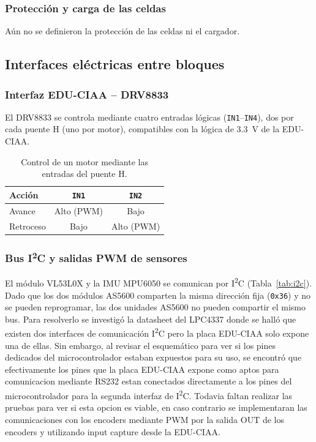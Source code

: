 \subsubsection{Protección y carga de las celdas}
Aún no se definieron la protección de las celdas ni el cargador.

\subsection{Interfaces eléctricas entre bloques}
\subsubsection{Interfaz EDU-CIAA -- DRV8833}
El DRV8833 se controla mediante cuatro entradas lógicas (\texttt{IN1}--\texttt{IN4}), dos por cada puente H (uno por motor), compatibles con la lógica de \SI{3,3}{V} de la EDU-CIAA.

\begin{table}[H]
\centering
\caption{Control de un motor mediante las entradas del puente H.}
\label{tab:logica}
\begin{tabular}{lcc}
\toprule
Acción & \texttt{IN1} & \texttt{IN2} \\
\midrule
Avance & Alto (PWM) & Bajo \\
Retroceso & Bajo & Alto (PWM) \\
\bottomrule
\end{tabular}
\end{table}

\subsubsection{Bus \texorpdfstring{I\textsuperscript{2}C}{I2C} y salidas PWM de sensores}\label{sec:i2c}
El módulo VL53L0X y la IMU MPU6050 se comunican por I\textsuperscript{2}C (Tabla~\ref{tab:i2c}). Dado que los dos módulos AS5600 comparten la misma dirección fija (\texttt{0x36}) y no se pueden reprogramar, las dos unidades AS5600 no pueden compartir el mismo bus. Para resolverlo se investigó la datasheet del LPC4337 donde se halló que existen dos interfaces de comunicación  I\textsuperscript{2}C pero la placa EDU-CIAA solo expone una de ellas. Sin embargo, al revisar el esquemático para ver si los pines dedicados del microcontrolador estaban expuestos para su uso, se encontró que efectivamente los pines que la placa EDU-CIAA expone como aptos para comunicacion mediante RS232 estan conectados directamente a los pines del microcontrolador para la segunda interfaz de I\textsuperscript{2}C. Todavia faltan realizar las pruebas para ver si esta opcion es viable, en caso contrario se implementaran las comunicaciones con los encoders mediante PWM por la salida OUT de los encoders y utilizando input capture desde la EDU-CIAA.


